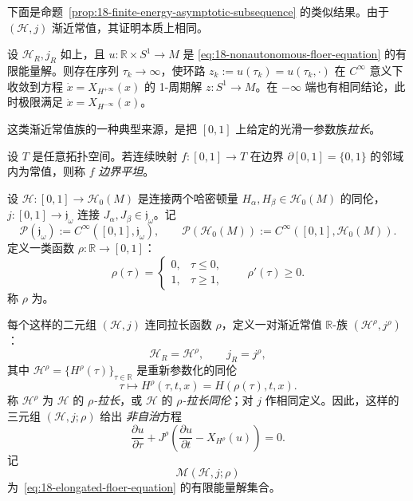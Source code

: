 下面是命题~\ref{prop:18-finite-energy-asymptotic-subsequence} 的类似结果。由于
$(\mathcal H,j)$ 渐近常值，其证明本质上相同。

\begin{proposition}
\label{prop:18-nonautonomous-asymptotic-subsequence}
设 $\mathcal H_R,j_R$ 如上，且 $u:\mathbb R\times S^1\to M$ 是
\eqref{eq:18-nonautonomous-floer-equation} 的有限能量解。则存在序列
$\tau_k\to\infty$，使环路 $z_k:=u(\tau_k)=u(\tau_k,\cdot)$ 在 $C^\infty$ 意义下
收敛到\personHamilton{}方程 $\dot x=X_{H^{+\infty}}(x)$ 的 1-周期解
$z:S^1\to M$。在 $-\infty$ 端也有相同结论，此时极限满足
$\dot x=X_{H^{-\infty}}(x)$。
\end{proposition}

这类渐近常值族的一种典型来源，是把 $[0,1]$ 上给定的光滑一参数族\emph{拉长}。

\begin{definition}
\label{def:18-boundary-flat-map}
设 $T$ 是任意拓扑空间。若连续映射 $f:[0,1]\to T$ 在边界
$\partial[0,1]=\{0,1\}$ 的邻域内为常值，则称 $f$ \emph{边界平坦}。
\end{definition}

设 $\mathcal H:[0,1]\to\mathcal H_0(M)$ 是连接两个哈密顿量
$H_\alpha,H_\beta\in\mathcal H_0(M)$ 的同伦，
$j:[0,1]\to\mathfrak j_\omega$ 连接 $J_\alpha,J_\beta\in\mathfrak j_\omega$。记
\[
 \mathcal P(\mathfrak j_\omega):=C^\infty([0,1],\mathfrak j_\omega),
 \qquad
 \mathcal P(\mathcal H_0(M)):=C^\infty([0,1],\mathcal H_0(M)).
\]
定义一类函数 $\rho:\mathbb R\to[0,1]$：
\begin{equation}
 \rho(\tau)=\begin{cases}
 0,&\tau\leq0,\\
 1,&\tau\geq1,
 \end{cases}
 \qquad \rho'(\tau)\geq0.
 \label{eq:18-elongation-function}
\end{equation}
称 $\rho$ 为\termElongationFunction{}。

每个这样的二元组 $(\mathcal H,j)$ 连同拉长函数 $\rho$，定义一对渐近常值
$\mathbb R$-族 $(\mathcal H^\rho,j^\rho)$：
\[
 \mathcal H_R=\mathcal H^\rho,\qquad j_R=j^\rho,
\]
其中 $\mathcal H^\rho=\{H^\rho(\tau)\}_{\tau\in\mathbb R}$ 是重新参数化的同伦
\[
 \tau\longmapsto H^\rho(\tau,t,x)=H(\rho(\tau),t,x).
\]
称 $\mathcal H^\rho$ 为 $\mathcal H$ 的 \emph{$\rho$-拉长}，或 $\mathcal H$ 的
\emph{$\rho$-拉长同伦}；对 $j$ 作相同定义。因此，这样的三元组 $(\mathcal H,j;\rho)$ 给出
\emph{非自治}方程
\begin{equation}
 \frac{\partial u}{\partial\tau}
 +J^\rho\left(\frac{\partial u}{\partial t}-X_{H^\rho}(u)\right)=0.
 \label{eq:18-elongated-floer-equation}
\end{equation}
记
\[
 \mathcal M(\mathcal H,j;\rho)
\]
为~\eqref{eq:18-elongated-floer-equation} 的有限能量解集合。
